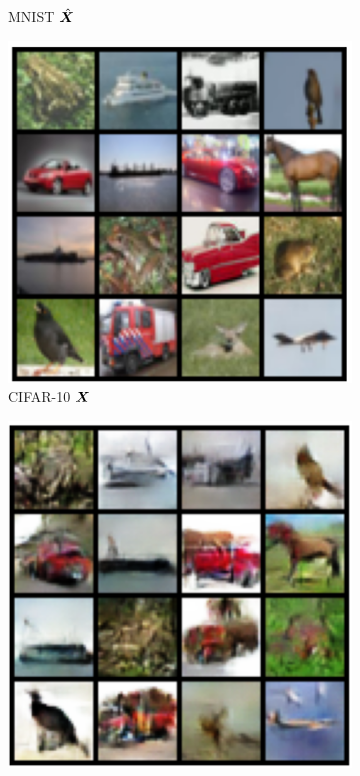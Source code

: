 \documentclass[../../book-main.tex]{subfiles}
\begin{document}
\begin{figure}[t]
\begin{subfigure}[t]{0.20\textwidth}
        \caption{MNIST $\hat{\bm{X}}$}
    \end{subfigure}
    \hfill
    \begin{subfigure}[t]{0.20\textwidth}
        \centering
        \includegraphics[width=\textwidth]{chapters/chapter5/figs/cifar10_x.png}
        \caption{CIFAR-10 $\bm{X}$}
    \end{subfigure}
    \hfill
    \begin{subfigure}[t]{0.20\textwidth}
        \centering
        \includegraphics[width=\textwidth]{chapters/chapter5/figs/cifar10_x_recon.png}

\end{subfigure}
\end{figure}
\end{document}
